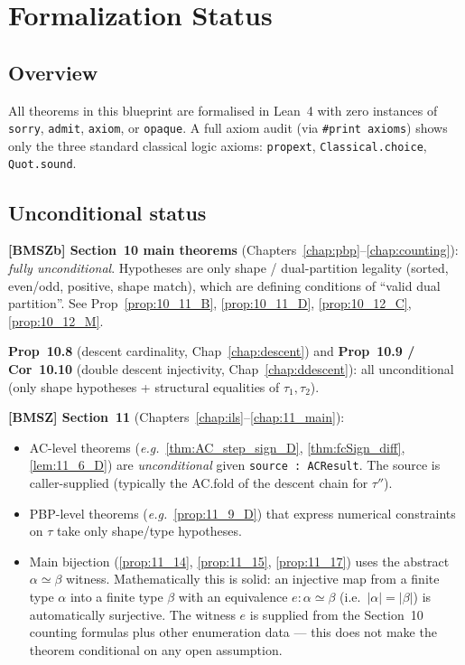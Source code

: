 \chapter{Formalization Status}
\label{chap:status}

\section{Overview}

All theorems in this blueprint are formalised in Lean~4 with zero instances of
\texttt{sorry}, \texttt{admit}, \texttt{axiom}, or \texttt{opaque}. A full
axiom audit (via \texttt{\#print axioms}) shows only the three standard
classical logic axioms:
\texttt{propext}, \texttt{Classical.choice}, \texttt{Quot.sound}.

\section{Unconditional status}

\textbf{[BMSZb] Section~10 main theorems} (Chapters~\ref{chap:pbp}--\ref{chap:counting}):
\emph{fully unconditional}. Hypotheses are only shape / dual-partition legality
(sorted, even/odd, positive, shape match), which are defining conditions of
``valid dual partition''. See
Prop~\ref{prop:10_11_B}, \ref{prop:10_11_D}, \ref{prop:10_12_C}, \ref{prop:10_12_M}.

\textbf{Prop~10.8} (descent cardinality, Chap~\ref{chap:descent}) and
\textbf{Prop~10.9 / Cor~10.10} (double descent injectivity, Chap~\ref{chap:ddescent}):
all unconditional (only shape hypotheses + structural equalities of $\tau_1, \tau_2$).

\textbf{[BMSZ] Section~11} (Chapters~\ref{chap:ils}--\ref{chap:11_main}):
\begin{itemize}
\item AC-level theorems (\emph{e.g.}~\ref{thm:AC_step_sign_D}, \ref{thm:fcSign_diff}, \ref{lem:11_6_D}) are
  \emph{unconditional} given \texttt{source : ACResult}. The source is
  caller-supplied (typically the AC.fold of the descent chain for $\tau''$).
\item PBP-level theorems (\emph{e.g.}~\ref{prop:11_9_D}) that express
  numerical constraints on $\tau$ take only shape/type hypotheses.
\item Main bijection (\ref{prop:11_14}, \ref{prop:11_15}, \ref{prop:11_17}) uses the
  abstract $\alpha \simeq \beta$ witness. Mathematically this is solid:
  an injective map from a finite type $\alpha$ into a finite type $\beta$ with
  an equivalence $e : \alpha \simeq \beta$ (i.e.\ $|\alpha| = |\beta|$) is
  automatically surjective. The witness $e$ is supplied from the Section~10
  counting formulas plus other enumeration data — this does not make the
  theorem conditional on any open assumption.
\end{itemize}


